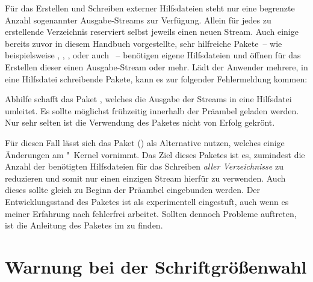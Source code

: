 %
Für das Erstellen und Schreiben externer Hilfsdateien steht  nur 
eine begrenzte Anzahl sogenannter Ausgabe-Streams zur Verfügung. Allein für 
jedes zu erstellende Verzeichnis reserviert  selbst jeweils einen 
neuen Stream. Auch einige bereits zuvor in diesem Handbuch vorgestellte, sehr 
hilfreiche Pakete~-- wie beispielsweise , , 
,  oder auch ~-- 
benötigen eigene Hilfsdateien und öffnen für das Erstellen dieser einen 
Ausgabe-Stream oder mehr. Lädt der Anwender mehrere, in eine Hilfsdatei 
schreibende Pakete, kann es zur folgender Fehlermeldung kommen:
%
\begin{quoting}
\end{quoting}
%
Abhilfe schafft das Paket , welches die Ausgabe der Streams 
in eine Hilfsdatei umleitet. Es sollte möglichst frühzeitig innerhalb der 
Präambel geladen werden. Nur sehr selten ist die Verwendung des Paketes nicht 
von Erfolg gekrönt. 

Für diesen Fall lässt sich das Paket () 
als Alternative nutzen, welches einige Änderungen am "~Kernel 
vornimmt. Das Ziel dieses Paketes ist es, zumindest die Anzahl der benötigten 
Hilfsdateien für das Schreiben \emph{aller Verzeichnisse} zu reduzieren und 
somit nur einen einzigen Stream hierfür zu verwenden. Auch dieses sollte gleich 
zu Beginn der Präambel eingebunden werden. Der Entwicklungsstand des Paketes 
ist als experimentell eingestuft, auch wenn es meiner Erfahrung nach fehlerfrei 
arbeitet. Sollten dennoch Probleme auftreten, ist die Anleitung des Paketes im 
\scrguide zu finden. 



\section{%
  Warnung bei der Schriftgrößenwahl%
  \label{sec:tips:fontsize}%
}


